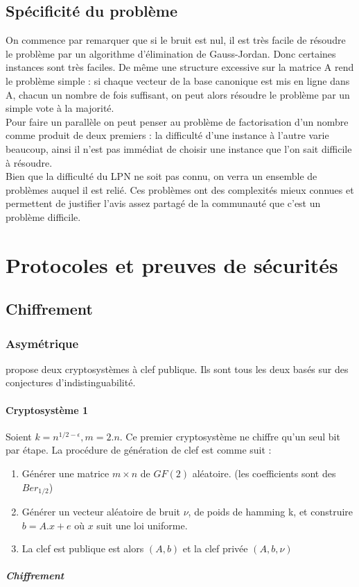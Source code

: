 \documentclass{article}		%
\theoremstyle{definition}
\theoremstyle{plain}
\theoremstyle{plain}
\theoremstyle{plain}
\theoremstyle{plain}
\theoremstyle{plain}
\begin{document}
\subsection{Spécificité du problème}
On commence par remarquer que si le bruit est nul, il est très facile de
résoudre le problème par un algorithme d'élimination de Gauss-Jordan.
Donc certaines instances sont très faciles. De même une structure
excessive sur la matrice A rend le problème simple : si chaque vecteur de
la base canonique est mis en ligne dans A, chacun un nombre de fois
suffisant, on peut alors résoudre le problème par un simple vote à la 
majorité.
\\
Pour faire un parallèle on peut penser au problème de factorisation d'un
nombre comme produit de deux premiers : la difficulté d'une instance à
l'autre varie beaucoup, ainsi il n'est pas immédiat de choisir une instance
que l'on sait difficile à résoudre. 
\\
Bien que la difficulté du LPN ne soit pas connu, on verra un ensemble de
problèmes auquel il est relié. Ces problèmes ont des complexités mieux
connues et permettent de justifier l'avis assez partagé de la communauté
que c'est un problème difficile.

\section{Protocoles et preuves de sécurités}
\subsection{Chiffrement}
\subsubsection{Asymétrique}
\cite{Alekh}  propose deux cryptosystèmes à clef publique. Ils sont tous
les deux basés sur des conjectures d'indistinguabilité.
\paragraph{Cryptosystème 1}
Soient $k=n^{1/2-\epsilon}, m=2.n$. Ce premier cryptosystème ne chiffre
qu'un seul bit par étape. La procédure de génération de clef est comme
suit :
\begin{enumerate}
\item Générer une matrice $m\times n$ de $GF(2)$ aléatoire.
(les coefficients sont des $Ber_{1/2}$)
\item Générer un vecteur aléatoire de bruit $\nu$, de poids de hamming k,
et construire $b=A.x+e$ où $x$ suit une loi uniforme.
\item La clef est publique est alors $(A,b)$ et la clef privée
$(A,b,\nu)$
\end{enumerate}
\subparagraph{Chiffrement}
\end{document}

